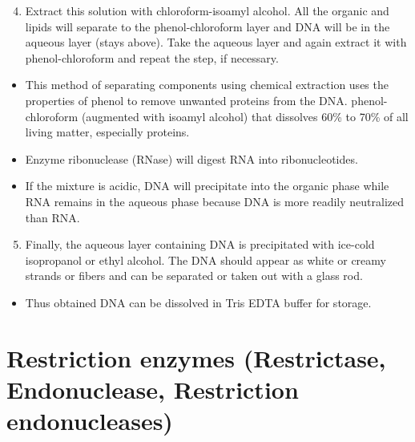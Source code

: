 \documentclass[11pt,dvipsnames,ignorenonframetext,aspectratio=169]{beamer}
\providecommand{\tightlist}{%
  \setlength{\itemsep}{0pt}\setlength{\parskip}{0pt}}
\begin{document}
\begin{frame}{}
\protect\hypertarget{section-9}{}
\begin{enumerate}
\setcounter{enumi}{3}
\tightlist
\item
  Extract this solution with chloroform-isoamyl alcohol. All the organic
  and lipids will separate to the phenol-chloroform layer and DNA will
  be in the aqueous layer (stays above). Take the aqueous layer and
  again extract it with phenol-chloroform and repeat the step, if
  necessary.
\end{enumerate}

\begin{itemize}
\tightlist
\item
  This method of separating components using chemical extraction uses
  the properties of phenol to remove unwanted proteins from the DNA.
  phenol-chloroform (augmented with isoamyl alcohol) that dissolves 60\%
  to 70\% of all living matter, especially proteins.
\item
  Enzyme ribonuclease (RNase) will digest RNA into ribonucleotides.
\item
  If the mixture is acidic, DNA will precipitate into the organic phase
  while RNA remains in the aqueous phase because DNA is more readily
  neutralized than RNA.
\end{itemize}

\begin{enumerate}
\setcounter{enumi}{4}
\tightlist
\item
  Finally, the aqueous layer containing DNA is precipitated with
  ice-cold isopropanol or ethyl alcohol. The DNA should appear as white
  or creamy strands or fibers and can be separated or taken out with a
  glass rod.
\end{enumerate}

\begin{itemize}
\tightlist
\item
  Thus obtained DNA can be dissolved in Tris EDTA buffer for storage.
\end{itemize}
\end{frame}

\hypertarget{restriction-enzymes-restrictase-endonuclease-restriction-endonucleases}{%
\section{Restriction enzymes (Restrictase, Endonuclease, Restriction
endonucleases)}\label{restriction-enzymes-restrictase-endonuclease-restriction-endonucleases}}
\end{document}
